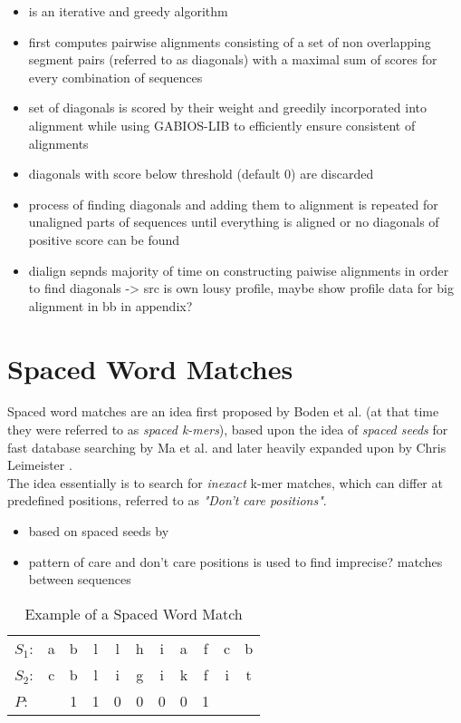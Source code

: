 \begin{itemize}
	\item is an iterative and greedy algorithm
	\item first computes pairwise alignments  consisting of a set of non overlapping segment pairs (referred to as diagonals) with a maximal sum of scores for every combination of sequences
	\item set of diagonals is scored by their weight and greedily incorporated into alignment while using GABIOS-LIB to efficiently ensure consistent of alignments
	\item diagonals with score below threshold (default 0) are discarded
	\item process of finding diagonals and adding them to alignment is repeated for unaligned parts of sequences until everything is aligned or no diagonals of positive score can be found
	\item dialign sepnds majority of time on constructing paiwise alignments in order to find diagonals -> src is own lousy profile, maybe show profile data for big alignment in bb in appendix?
\end{itemize}



\section{Spaced Word Matches}

Spaced word matches are an idea first proposed by Boden et al. \cite{boden2013alignment} (at that time they were referred to as \textit{spaced k-mers}), based upon the idea of \textit{spaced seeds} for fast database searching by Ma et al. \cite{ma2002patternhunter} and later heavily expanded upon by Chris Leimeister \cite{leimeister2014fast, leimeister2017fast, leimeister2018accurate}.\\
The idea essentially is to search for \textit{inexact} k-mer matches, which can differ at predefined positions, referred to as \textit{"Don't care positions"}. 

\begin{itemize}
	\item based on spaced seeds by \cite{ma2002patternhunter}
	\item pattern of care and don't care positions is used to find imprecise? matches between sequences 
\end{itemize}

\begin{table}[H]
	\centering
	\begin{tabular}{ l c c c c c c c c c c}
		$S_1$: & a&b&l&l&h&i&a&f&c&b \\ 
		$S_2$: & c&b&l&i&g&i&k&f&i&t \\  
		$P$: &    &1&1&0&0&0&0&1
	\end{tabular}
	\caption{Example of a Spaced Word Match}
	\label{tab:spaced-word}
\end{table}

